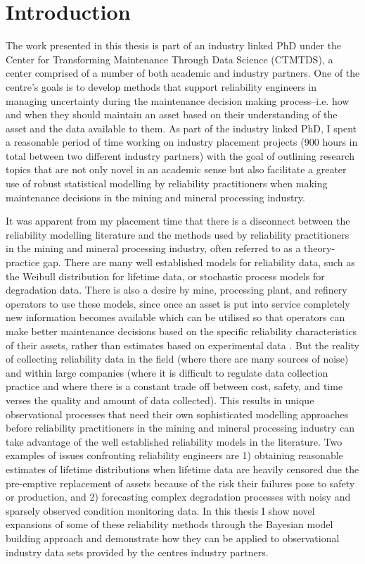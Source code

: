 \chapter{Introduction}\label{chap:chapter1}

The work presented in this thesis is part of an industry linked PhD under the Center for Transforming Maintenance Through Data Science (CTMTDS), a center comprised of a number of both academic and industry partners. One of the centre's goals is to develop methods that support reliability engineers in managing uncertainty during the maintenance decision making process--i.e. how and when they should maintain an asset based on their understanding of the asset and the data available to them. As part of the industry linked PhD, I spent a reasonable period of time working on industry placement projects (900 hours in total between two different industry partners) with the goal of outlining research topics that are not only novel in an academic sense but also facilitate a greater use of robust statistical modelling by reliability practitioners when making maintenance decisions in the mining and mineral processing industry.

It was apparent from my placement time that there is a disconnect between the reliability modelling literature and the methods used by reliability practitioners in the mining and mineral processing industry, often referred to as a theory-practice gap. There are many well established models for reliability data, such as the Weibull distribution for lifetime data, or stochastic process models for degradation data. There is also a desire by mine, processing plant, and refinery operators to use these models, since once an asset is put into service completely new information becomes available which can be utilised so that operators can make better maintenance decisions based on the specific reliability characteristics of their assets, rather than estimates based on experimental data \citep{jardine2013}. But the reality of collecting reliability data in the field (where there are many sources of noise) and within large companies (where it is difficult to regulate data collection practice and where there is a constant trade off between cost, safety, and time verses the quality and amount of data collected). This results in unique observational processes that need their own sophisticated modelling approaches before reliability practitioners in the mining and mineral processing industry can take advantage of the well established reliability models in the literature. Two examples of issues confronting reliability engineers are 1) obtaining reasonable estimates of lifetime distributions when lifetime data are heavily censored due the pre-emptive replacement of assets because of the risk their failures pose to safety or production, and 2) forecasting complex degradation processes with noisy and sparsely observed condition monitoring data. In this thesis I show novel expansions of some of these reliability methods through the Bayesian model building approach \citep{gelman_workflow_2020} and demonstrate how they can be applied to observational industry data sets provided by the centres industry partners.

